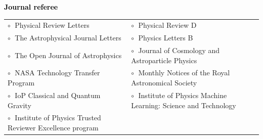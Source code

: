 \textbf{\textcolor{black}{Journal referee}}
\vspace{0.1cm}

{\footnotesize
\begin{tabular}{@{\hskip 0.4cm}l@{\hskip 0.1in}l}
$\circ\;$  Physical Review Letters & $\circ\;$ Physical Review D \\
$\circ\;$  The Astrophysical Journal Letters & $\circ\;$ Physics Letters B \\
$\circ\;$  The Open Journal of Astrophysics & $\circ\;$ Journal of Cosmology and Astroparticle Physics \\
$\circ\;$  NASA Technology Transfer Program & $\circ\;$ Monthly Notices of the Royal Astronomical Society \\
$\circ\;$  IoP Classical and Quantum Gravity & $\circ\;$ Institute of Physics Machine Learning: Science and Technology \\
$\circ\;$  Institute of Physics Trusted Reviewer Excellence program\\
\end{tabular}
}